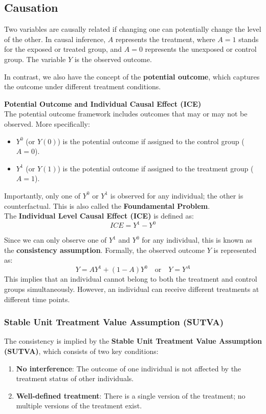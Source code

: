 \subsection{Causation}
Two variables are causally related if changing one can potentially change the level of the other. In causal inference, \( A \) represents the treatment, where \( A=1 \) stands for the exposed or treated group, and \( A=0 \) represents the unexposed or control group. The variable \( Y \) is the observed outcome.

In contrast, we also have the concept of the \textbf{potential outcome}, which captures the outcome under different treatment conditions.
\begin{definition}
    \textbf{Potential Outcome and Individual Causal Effect (ICE)}\\
    The potential outcome framework includes outcomes that may or may not be observed. More specifically:
    \begin{itemize}
        \item \( Y^0 \) (or \( Y(0) \)) is the potential outcome if assigned to the control group (\( A=0 \)).
        \item \( Y^1 \) (or \( Y(1) \)) is the potential outcome if assigned to the treatment group (\( A=1 \)).
    \end{itemize}
    Importantly, only one of \( Y^0 \) or \( Y^1 \) is observed for any individual; the other is counterfactual. This is also called the \textbf{Foundamental Problem}.\\
    
    The \textbf{Individual Level Causal Effect (ICE)} is defined as:
    \[
    ICE = Y^1 - Y^0
    \]
\end{definition}

Since we can only observe one of \( Y^1 \) and \( Y^0 \) for any individual, this is known as the \textbf{consistency assumption}. Formally, the observed outcome \( Y \) is represented as:
\[
Y = A Y^1 + (1 - A) Y^0 \quad \text{or} \quad Y = Y^A
\]
This implies that an individual cannot belong to both the treatment and control groups simultaneously. However, an individual can receive different treatments at different time points.

\subsubsection{Stable Unit Treatment Value Assumption (SUTVA)}
The consistency is implied by the \textbf{Stable Unit Treatment Value Assumption (SUTVA)}, which consists of two key conditions:
\begin{enumerate}
    \item \textbf{No interference}: The outcome of one individual is not affected by the treatment status of other individuals.
    \item \textbf{Well-defined treatment}: There is a single version of the treatment; no multiple versions of the treatment exist.
\end{enumerate}
